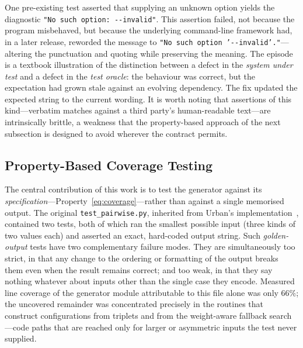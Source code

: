 \documentclass[
  digital, %
  oneside, %
  lof,     %
  nolot,     %
]{fithesis4}
\begin{document}
One pre-existing test asserted that supplying an unknown option yields the
diagnostic \texttt{"No such option: -{}-invalid"}. This assertion failed, not
because the program misbehaved, but because the underlying command-line
framework had, in a later release, reworded the message to
\texttt{"No such option '-{}-invalid'."}---altering the punctuation and quoting
while preserving the meaning. The episode is a textbook illustration of the
distinction between a defect in the \emph{system under test} and a defect in the
\emph{test oracle}: the behaviour was correct, but the expectation had grown
stale against an evolving dependency. The fix updated the expected string to the
current wording. It is worth noting that assertions of this kind---verbatim
matches against a third party's human-readable text---are intrinsically brittle,
a weakness that the property-based approach of the next subsection is designed to
avoid wherever the contract permits.

\subsection{Property-Based Coverage Testing}
\label{sec:tsi-property}

The central contribution of this work is to test the generator against its
\emph{specification}---Property~\eqref{eq:coverage}---rather than against a
single memorised output. The original \texttt{test\_pairwise.py}, inherited from Urban's
implementation~\cite{Urban2024thesis}, contained two tests, both of which ran the smallest possible input (three kinds of two values
each) and asserted an exact, hard-coded output string. Such \emph{golden-output}
tests have two complementary failure modes. They are simultaneously too strict,
in that any change to the ordering or formatting of the output breaks them even
when the result remains correct; and too weak, in that they say nothing whatever
about inputs other than the single case they encode. Measured line coverage of
the generator module attributable to this file alone was only $66\%$; the
uncovered remainder was concentrated precisely in the routines that construct
configurations from triplets and from the weight-aware fallback search---code
paths that are reached only for larger or asymmetric inputs the test never
supplied.
\end{document}
